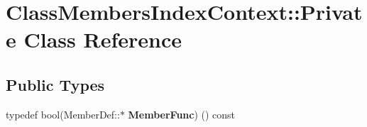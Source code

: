 \hypertarget{class_class_members_index_context_1_1_private}{}\section{Class\+Members\+Index\+Context\+::Private Class Reference}
\label{class_class_members_index_context_1_1_private}
\subsection*{Public Types}
\begin{DoxyCompactItemize}
\item 
\mbox{\label{class_class_members_index_context_1_1_private_a1ae8ed8c4409f56e4cf13386e8aff61d}} 
typedef bool(Member\+Def\+::$\ast$ {\bfseries Member\+Func}) () const
\end{DoxyCompactItemize}
